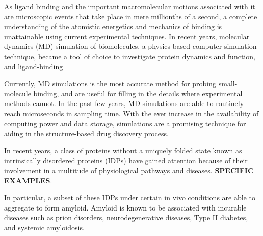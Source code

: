 As ligand binding and the important macromolecular motions associated with it are microscopic events that take place in mere millionths of a second, a complete understanding of the atomistic energetics and mechanics of binding is unattainable using current experimental techniques. In recent years, molecular dynamics (MD) simulation of biomolecules, a physics-based computer simulation technique, became a tool of choice to investigate protein dynamics and function, and ligand-binding

Currently, MD simulations is the most accurate method for probing small-molecule binding, and are useful for filling in the details where experimental methods cannot.\cite{Durrant:2011bm} In the past few years, MD simulations are able to routinely reach microseconds in sampling time. With the ever increase in the availability of computing power and data storage, simulations are a promising technique for aiding in the structure-based drug discovery process. 

In recent years, a class of proteins without a uniquely folded state known as intrinsically disordered proteins (IDPs) have gained attention because of their involvement in a multitude of physiological pathways and diseases. \textbf{SPECIFIC EXAMPLES}.\cite{d2, dobson, sarah's thesis, caflisch disordered binding} 

In particular, a subset of these IDPs under certain in vivo conditions are able to aggregate to form amyloid. Amyloid is known to be associated with incurable diseases such as prion disorders, neurodegenerative diseases, Type II diabetes, and systemic amyloidosis. 



